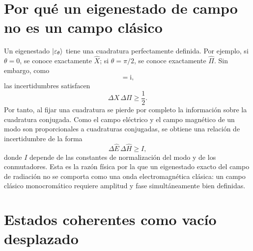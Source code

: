 \documentclass[11pt]{article}
\newcommand{\ii}{\mathrm{i}}
\begin{document}
\section{Por qu\'e un eigenestado de campo no es un campo cl\'asico}

Un eigenestado $\ket{\varepsilon_\theta}$ tiene una cuadratura perfectamente
definida. Por ejemplo, si $\theta=0$, se conoce exactamente $\hat X$; si
$\theta=\pi/2$, se conoce exactamente $\hat\Pi$. Sin embargo, como
\begin{equation}
  [\hat X,\hat\Pi]=\ii,
\end{equation}
las incertidumbres satisfacen
\begin{equation}
  \Delta X\,\Delta\Pi\ge\frac12.
\end{equation}
Por tanto, al fijar una cuadratura se pierde por completo la informaci\'on
sobre la cuadratura conjugada. Como el campo el\'ectrico y el campo magn\'etico
de un modo son proporcionales a cuadraturas conjugadas, se obtiene una relaci\'on
de incertidumbre de la forma
\begin{equation}
  \Delta \hat E\,\Delta \hat H\ge I,
\end{equation}
donde $I$ depende de las constantes de normalizaci\'on del modo y de los
conmutadores. Esta es la raz\'on f\'isica por la que un eigenestado exacto del
campo de radiaci\'on no se comporta como una onda electromagn\'etica cl\'asica:
un campo cl\'asico monocrom\'atico requiere amplitud y fase simult\'aneamente
bien definidas.

\section{Estados coherentes como vac\'io desplazado}
\end{document}
